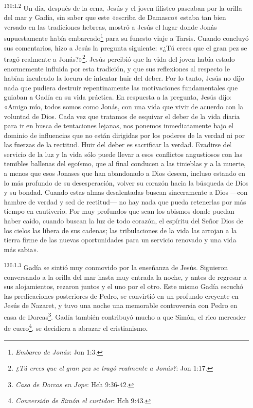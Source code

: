\par
\textsuperscript{130:1.2} Un día, después de la cena, Jesús y el joven filisteo paseaban por la orilla del mar y Gadía, sin saber que este «escriba de Damasco» estaba tan bien versado en las tradiciones hebreas, mostró a Jesús el lugar donde Jonás supuestamente había embarcado\footnote{\textit{Embarco de Jonás}: Jon 1:3.} para su funesto viaje a Tarsis. Cuando concluyó sus comentarios, hizo a Jesús la pregunta siguiente: «¿Tú crees que el gran pez se tragó realmente a Jonás?»\footnote{\textit{¿Tú crees que el gran pez se tragó realmente a Jonás?}: Jon 1:17.}. Jesús percibió que la vida del joven había estado enormemente influida por esta tradición, y que sus reflexiones al respecto le habían inculcado la locura de intentar huir del deber. Por lo tanto, Jesús no dijo nada que pudiera destruir repentinamente las motivaciones fundamentales que guiaban a Gadía en su vida práctica. En respuesta a la pregunta, Jesús dijo: «Amigo mío, todos somos como Jonás, con una vida que vivir de acuerdo con la voluntad de Dios. Cada vez que tratamos de esquivar el deber de la vida diaria para ir en busca de tentaciones lejanas, nos ponemos inmediatamente bajo el dominio de influencias que no están dirigidas por los poderes de la verdad ni por las fuerzas de la rectitud. Huir del deber es sacrificar la verdad. Evadirse del servicio de la luz y la vida sólo puede llevar a esos conflictos angustiosos con las temibles ballenas del egoísmo, que al final conducen a las tinieblas y a la muerte, a menos que esos Jonases que han abandonado a Dios deseen, incluso estando en lo más profundo de su desesperación, volver su corazón hacia la búsqueda de Dios y su bondad. Cuando estas almas desalentadas buscan sinceramente a Dios ---con hambre de verdad y sed de rectitud--- no hay nada que pueda retenerlas por más tiempo en cautiverio. Por muy profundos que sean los abismos donde puedan haber caído, cuando buscan la luz de todo corazón, el espíritu del Señor Dios de los cielos las libera de sus cadenas; las tribulaciones de la vida las arrojan a la tierra firme de las nuevas oportunidades para un servicio renovado y una vida más sabia».

\par
\textsuperscript{130:1.3} Gadía se sintió muy conmovido por la enseñanza de Jesús. Siguieron conversando a la orilla del mar hasta muy entrada la noche, y antes de regresar a sus alojamientos, rezaron juntos y el uno por el otro. Este mismo Gadía escuchó las predicaciones posteriores de Pedro, se convirtió en un profundo creyente en Jesús de Nazaret, y tuvo una noche una memorable controversia con Pedro en casa de Dorcas\footnote{\textit{Casa de Dorcas en Jope}: Hch 9:36-42.}. Gadía también contribuyó mucho a que Simón, el rico mercader de cuero\footnote{\textit{Conversión de Simón el curtidor}: Hch 9:43.}, se decidiera a abrazar el cristianismo.

